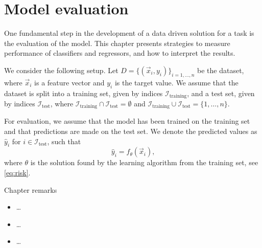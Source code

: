 \chapter{Model evaluation}
\label{chap:evaluation}


One fundamental step in the development of a data driven solution for a task is the
evaluation of the model. This chapter presents strategies to measure performance of
classifiers and regressors, and how to interpret the results.

We consider the following setup.  Let $D = \{(\vec{x}_i, y_i)\}_{i=1,\dots,n}$ be the
dataset, where $\vec{x}_i$ is a feature vector and $y_i$ is the target value.  We assume
that the dataset is split into a training set, given by indices
$\mathcal{I}_\text{training}$, and a test set, given by indices $\mathcal{I}_\text{test}$,
where $\mathcal{I}_\text{training} \cap \mathcal{I}_\text{test} = \emptyset$ and
$\mathcal{I}_\text{training} \cup \mathcal{I}_\text{test} = \{1,\dots,n\}$.

For evaluation, we assume that the model has been trained on the training set and that
predictions are made on the test set.  We denote the predicted values as $\hat{y}_i$ for
$i \in \mathcal{I}_\text{test}$, such that
\begin{equation*}
  \hat{y}_i = f_\theta(\vec{x}_i)\text{,}
\end{equation*}
where $\theta$ is the solution found by the learning algorithm from the training set, see
\cref{eq:risk}.

\begin{mainbox}{Chapter remarks}


  \startcontents[chapters]
  \vspace{1em}


  \begin{itemize}
    \item \dots
  \end{itemize}


  \begin{itemize}
    \item \dots
  \end{itemize}


  \begin{itemize}
    \item \dots
  \end{itemize}
\end{mainbox}

